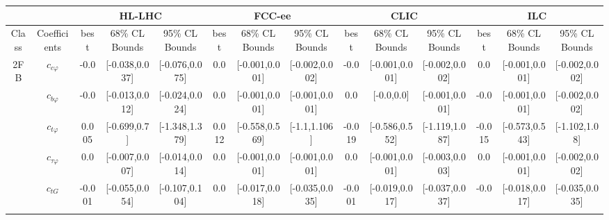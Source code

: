 \documentclass{article}
\begin{document}
\begin{table}[H]
\centering
\begin{tabular}{|c|c|c|c|c|c|c|c|c|c|c|c|c|c|}
\hline
 &  & \multicolumn{3}{c|}{HL-LHC} & \multicolumn{3}{c|}{FCC-ee} & \multicolumn{3}{c|}{CLIC} & \multicolumn{3}{c|}{ILC} \\ \hline
Class & Coefficients & best & 68\% CL Bounds & 95\% CL Bounds & best & 68\% CL Bounds & 95\% CL Bounds & best & 68\% CL Bounds & 95\% CL Bounds & best & 68\% CL Bounds & 95\% CL Bounds\\ \hline
\multirow{23}{*}{2FB}
 & $c_{c \varphi}$ & -0.0                             & [-0.038,0.037]                                 & [-0.076,0.075] & 0.0                             & [-0.001,0.001]                                 & [-0.002,0.002] & -0.0                             & [-0.001,0.001]                                 & [-0.002,0.002] & 0.0                             & [-0.001,0.001]                                 & [-0.002,0.002] \\ \cline{2-14}
 & $c_{b \varphi}$ & -0.0                             & [-0.013,0.012]                                 & [-0.024,0.024] & 0.0                             & [-0.001,0.001]                                 & [-0.001,0.001] & 0.0                             & [-0.0,0.0]                                 & [-0.001,0.001] & -0.0                             & [-0.001,0.001]                                 & [-0.002,0.002] \\ \cline{2-14}
 & $c_{t \varphi}$ & 0.005                             & [-0.699,0.7]                                 & [-1.348,1.379] & 0.012                             & [-0.558,0.569]                                 & [-1.1,1.106] & -0.019                             & [-0.586,0.552]                                 & [-1.119,1.087] & -0.015                             & [-0.573,0.543]                                 & [-1.102,1.08] \\ \cline{2-14}
 & $c_{\tau \varphi}$ & 0.0                             & [-0.007,0.007]                                 & [-0.014,0.014] & 0.0                             & [-0.001,0.001]                                 & [-0.001,0.001] & 0.0                             & [-0.001,0.001]                                 & [-0.003,0.003] & 0.0                             & [-0.001,0.001]                                 & [-0.002,0.002] \\ \cline{2-14}
 & $c_{tG}$ & -0.001                             & [-0.055,0.054]                                 & [-0.107,0.104] & 0.0                             & [-0.017,0.018]                                 & [-0.035,0.035] & -0.001                             & [-0.019,0.017]                                 & [-0.037,0.037] & -0.0                             & [-0.018,0.017]                                 & [-0.035,0.035] \\ \cline{2-14}

\end{tabular}
\end{table}
\end{document}
